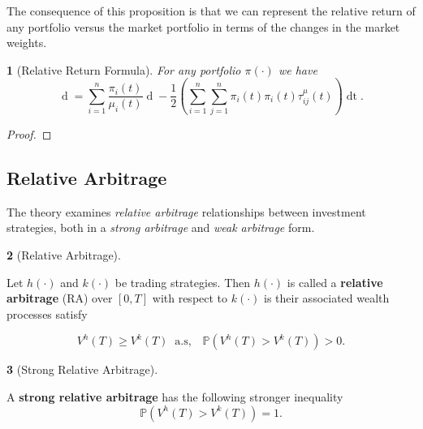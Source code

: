 \documentclass[british]{amsart} \usepackage{lmodern}
\numberwithin{equation}{section} \numberwithin{figure}{section}
\theoremstyle{plain} \newtheorem{thm}{\protect\theoremname}[section]
\theoremstyle{definition} \newtheorem{defn}[thm]{\protect\definitionname}
\theoremstyle{plain} \newtheorem{assumption}[thm]{\protect\assumptionname}
\theoremstyle{plain} \newtheorem{lem}[thm]{\protect\lemmaname}
\theoremstyle{plain} \newtheorem{prop}[thm]{\protect\propositionname}
\theoremstyle{remark} \newtheorem{rem}[thm]{\protect\remarkname}
\theoremstyle{plain} \newtheorem{cor}[thm]{\protect\corollaryname}
\renewcommand{\d}[1]{\mathop{\mathrm{d}{#1}}}
\begin{document}
The consequence of this proposition is that we can represent the relative 
return of any portfolio versus the market portfolio in terms of the changes 
in the market weights.

\begin{thm} [Relative Return Formula] For any portfolio $\pi(\cdot)$ we have
  \begin{equation*} 
    \d{ \log{ \left( \frac{ V^{\pi}(t) }{ V^{\mu}(t) } \right) }} = 
    \sum_{i=1}^{n} \frac{\pi_{i}(t)}{\mu_{i}(t)} \d{\mu_{i}(t)} - 
    \frac{1}{2} \left( 
        \sum_{i=1}^{n} \sum_{j=1}^{n} \pi_{i}(t) \pi_{i}(t) \tau_{ij}^{\mu}(t)
    \right) \d{t}. 
  \end{equation*} 
\end{thm}

\begin{proof} 
\end{proof}

\subsection{Relative Arbitrage}

The theory examines \textit{relative arbitrage} relationships between investment
strategies, both in a \textit{strong arbitrage} and \textit{weak arbitrage}
form.

\begin{defn} [Relative Arbitrage]
  \label{def:defstrongrelativearbitrage}

  Let $h(\cdot)$ and $k(\cdot)$ be trading strategies. Then
  $h(\cdot)$ is called a \textbf{relative arbitrage} (RA) over
  $[0,T]$ with respect to $k(\cdot)$ is their associated wealth
  processes satisfy

  \begin{equation}
    V^{h}(T)\ge V^{k}(T)\;\;\text{a.s},\;\;\;\mathbb{P}(V^{h}(T)>V^{k}(T))>0.
  \end{equation}
\end{defn}

\begin{defn} [Strong Relative Arbitrage]
  \label{def:defstrongrelativearbitrage}

  A \textbf{strong relative arbitrage} has the following stronger inequality
  \begin{equation}
    \mathbb{P}(V^{h}(T)>V^{k}(T))=1.
  \end{equation}
\end{defn}
\end{document}
